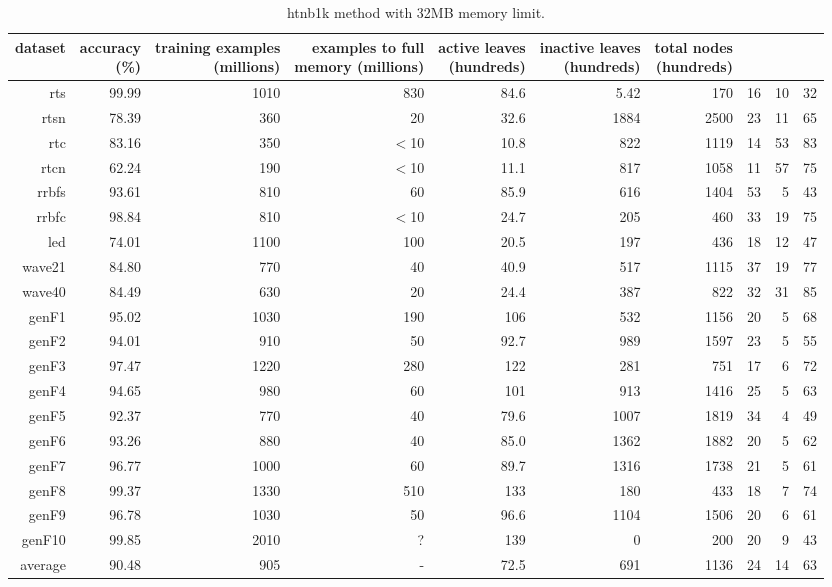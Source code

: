 \clearpage
\begin{table}
\caption{{\sc htnb1k} method with 32MB memory limit.}
\label{tab:htnb1k-32MB}
\centering
\begin{tabular}{|r|r|r|r|r|r|r|r|r|r|}
\hline
dataset	&
\rotatebox{90}{\parbox{9em}{accuracy\\(\%)}} &
\rotatebox{90}{\parbox{9em}{training examples\\(millions)}} &
\rotatebox{90}{\parbox{9em}{examples to full\\memory (millions)}} &
\rotatebox{90}{\parbox{9em}{active leaves\\(hundreds)}} &
\rotatebox{90}{\parbox{9em}{inactive leaves\\(hundreds)}} &
\rotatebox{90}{\parbox{9em}{total nodes\\(hundreds)}} &
\rotatebox{90}{\parbox{9em}{tree depth}}	&
\rotatebox{90}{\parbox{9em}{training speed (\%)}} &
\rotatebox{90}{\parbox{9em}{prediction speed (\%)}} \\
\hline
{\sc rts} & 99.99 & 1010 & 830 & 84.6 & 5.42 & 170 & 16 & 10 & 32 \\
{\sc rtsn} & 78.39 & 360 & 20 & 32.6 & 1884 & 2500 & 23 & 11 & 65 \\
{\sc rtc} & 83.16 & 350 & $<$10 & 10.8 & 822 & 1119 & 14 & 53 & 83 \\
{\sc rtcn} & 62.24 & 190 & $<$10 & 11.1 & 817 & 1058 & 11 & 57 & 75 \\
{\sc rrbfs} & 93.61 & 810 & 60 & 85.9 & 616 & 1404 & 53 & 5 & 43 \\
{\sc rrbfc} & 98.84 & 810 & $<$10 & 24.7 & 205 & 460 & 33 & 19 & 75 \\
{\sc led} & 74.01 & 1100 & 100 & 20.5 & 197 & 436 & 18 & 12 & 47 \\
{\sc wave21} & 84.80 & 770 & 40 & 40.9 & 517 & 1115 & 37 & 19 & 77 \\
{\sc wave40} & 84.49 & 630 & 20 & 24.4 & 387 & 822 & 32 & 31 & 85 \\
{\sc genF1} & 95.02 & 1030 & 190 & 106 & 532 & 1156 & 20 & 5 & 68 \\
{\sc genF2} & 94.01 & 910 & 50 & 92.7 & 989 & 1597 & 23 & 5 & 55 \\
{\sc genF3} & 97.47 & 1220 & 280 & 122 & 281 & 751 & 17 & 6 & 72 \\
{\sc genF4} & 94.65 & 980 & 60 & 101 & 913 & 1416 & 25 & 5 & 63 \\
{\sc genF5} & 92.37 & 770 & 40 & 79.6 & 1007 & 1819 & 34 & 4 & 49 \\
{\sc genF6} & 93.26 & 880 & 40 & 85.0 & 1362 & 1882 & 20 & 5 & 62 \\
{\sc genF7} & 96.77 & 1000 & 60 & 89.7 & 1316 & 1738 & 21 & 5 & 61 \\
{\sc genF8} & 99.37 & 1330 & 510 & 133 & 180 & 433 & 18 & 7 & 74 \\
{\sc genF9} & 96.78 & 1030 & 50 & 96.6 & 1104 & 1506 & 20 & 6 & 61 \\
{\sc genF10} & 99.85 & 2010 & ? & 139 & 0 & 200 & 20 & 9 & 43 \\
\hline
average & 90.48 & 905 &  -  & 72.5 & 691 & 1136 & 24 & 14 & 63 \\
\hline
\end{tabular}
\end{table}
